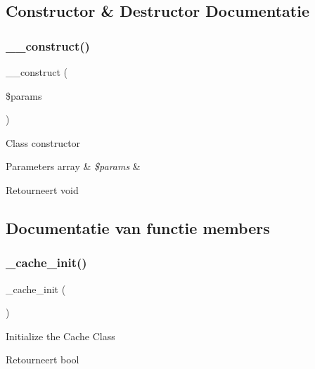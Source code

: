 \subsection{Constructor \& Destructor Documentatie}
\mbox{\label{class_c_i___d_b__driver_a9162320adff1a1a4afd7f2372f753a3e}} 
\subsubsection{\texorpdfstring{\_\_construct()}{\_\_construct()}}
{\footnotesize\ttfamily \+\_\+\+\_\+construct (\begin{DoxyParamCaption}\item[{}]{\$params }\end{DoxyParamCaption})}

Class constructor


\begin{DoxyParams}[1]{Parameters}
array & {\em \$params} & \\
\hline
\end{DoxyParams}
\begin{DoxyReturn}{Retourneert}
void 
\end{DoxyReturn}


\subsection{Documentatie van functie members}
\mbox{\label{class_c_i___d_b__driver_a3991c9b589034f12f6fed26d83ac47e4}} 
\subsubsection{\texorpdfstring{\_cache\_init()}{\_cache\_init()}}
{\footnotesize\ttfamily \+\_\+cache\+\_\+init (\begin{DoxyParamCaption}{ }\end{DoxyParamCaption})\hspace{0.3cm}{\ttfamily [protected]}}

Initialize the Cache Class

\begin{DoxyReturn}{Retourneert}
bool 
\end{DoxyReturn}
\mbox{\label{class_c_i___d_b__driver_a4d9082658000e5ede8312067c6dda9db}} 

